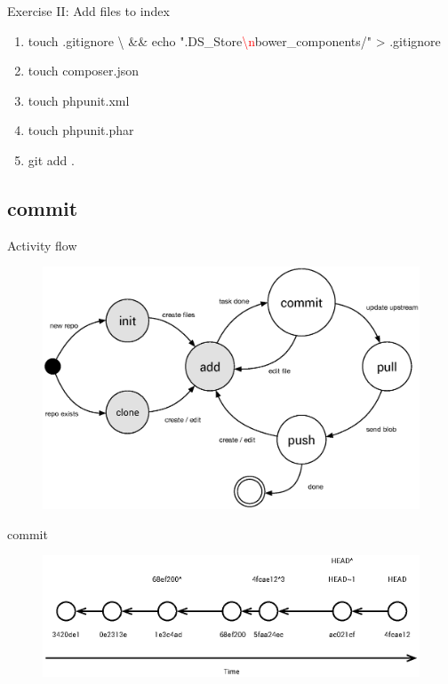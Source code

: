 \documentclass{beamer}
\begin{document}
\begin{frame}{Exercise II: Add files to index}
    \begin{enumerate}[\$]
        \item<1->touch .gitignore {\textbackslash} \newline
            \&\& echo ".DS\_Store{\textcolor{red}{{\textbackslash}n}}bower\_components/" > .gitignore
        \item<3-> touch composer.json
        \item<3-> touch phpunit.xml
        \item<3-> touch phpunit.phar
        \item<4-> git add .
    \end{enumerate}
    
\end{frame}

\subsection[commit]{commit}
\begin{frame}{Activity flow}
    \begin{figure}
        \center
        \includegraphics[width=.9\textwidth]{git-command-flow-2}
        \label{fig:git-command-flow-2}
    \end{figure}
\end{frame}

\begin{frame}{commit}
    \begin{figure}
        \center
        \includegraphics[width=.9\textwidth]{git-commit-flow}
        \label{fig:git-commit-flow}
    \end{figure}
\end{frame}
\end{document}
